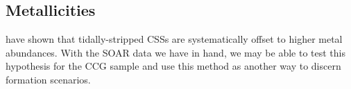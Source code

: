 \documentclass[iop,apj]{emulateapj}
\begin{document}
\subsection{Metallicities}
\noindent \citet{Janz2015} have shown that tidally-stripped CSSs are systematically offset to higher metal abundances. With the SOAR data we have in hand, we may be able to test this hypothesis for the CCG sample and use this method as another way to discern formation scenarios.





\appendix
\end{document}
